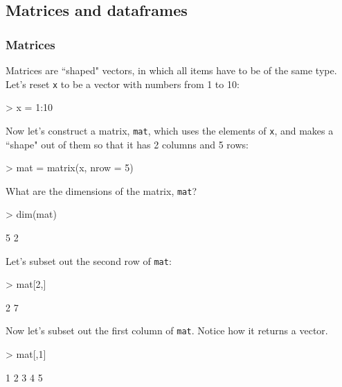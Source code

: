 \documentclass{exam}
\begin{document}
\subsection{Matrices and dataframes}

\subsubsection{Matrices}

Matrices are ``shaped" vectors, in which all items have to be of the same type. Let's reset \texttt{x} to be a vector with numbers from 1 to 10:
\begin{Schunk}
\begin{Sinput}
> x = 1:10
\end{Sinput}
\end{Schunk}
\noindent Now let's construct a matrix, \texttt{mat}, which uses the elements of \texttt{x}, and makes a ``shape" out of them so that it has 2 columns and 5 rows:
\begin{Schunk}
\begin{Sinput}
> mat = matrix(x, nrow = 5) 
\end{Sinput}
\end{Schunk}
\noindent What are the dimensions of the matrix, \texttt{mat}?
\begin{Schunk}
\begin{Sinput}
> dim(mat)
\end{Sinput}
\begin{Soutput}
[1] 5 2
\end{Soutput}
\end{Schunk}

\noindent Let's subset out the second row of \texttt{mat}:
\begin{Schunk}
\begin{Sinput}
> mat[2,] 
\end{Sinput}
\begin{Soutput}
[1] 2 7
\end{Soutput}
\end{Schunk}

\noindent Now let's subset out the first column of \texttt{mat}. Notice how it returns a vector.
\begin{Schunk}
\begin{Sinput}
> mat[,1] 
\end{Sinput}
\begin{Soutput}
[1] 1 2 3 4 5
\end{Soutput}
\end{Schunk}
\end{document}
